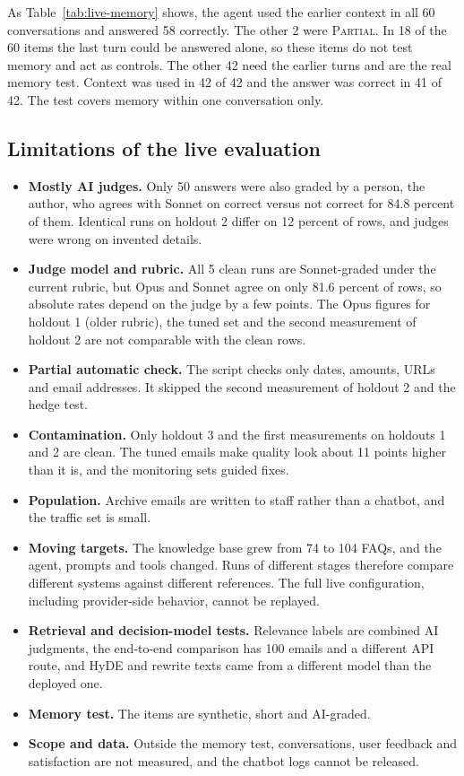 As Table~\ref{tab:live-memory} shows, the agent used the earlier context in all 60 conversations and answered 58 correctly. The other 2 were \textsc{Partial}. In 18 of the 60 items the last turn could be answered alone, so these items do not test memory and act as controls. The other 42 need the earlier turns and are the real memory test. Context was used in 42 of 42 and the answer was correct in 41 of 42. The test covers memory within one conversation only.

\subsection{Limitations of the live evaluation}
\label{sec:live-limits}

\begin{itemize}
  \item \textbf{Mostly AI judges.} Only 50 answers were also graded by a person, the author, who agrees with Sonnet on correct versus not correct for 84.8 percent of them. Identical runs on holdout 2 differ on 12 percent of rows, and judges were wrong on invented details.
  \item \textbf{Judge model and rubric.} All 5 clean runs are Sonnet-graded under the current rubric, but Opus and Sonnet agree on only 81.6 percent of rows, so absolute rates depend on the judge by a few points. The Opus figures for holdout 1 (older rubric), the tuned set and the second measurement of holdout 2 are not comparable with the clean rows.
  \item \textbf{Partial automatic check.} The script checks only dates, amounts, URLs and email addresses. It skipped the second measurement of holdout 2 and the hedge test.
  \item \textbf{Contamination.} Only holdout 3 and the first measurements on holdouts 1 and 2 are clean. The tuned emails make quality look about 11 points higher than it is, and the monitoring sets guided fixes.
  \item \textbf{Population.} Archive emails are written to staff rather than a chatbot, and the traffic set is small.
  \item \textbf{Moving targets.} The knowledge base grew from 74 to 104 FAQs, and the agent, prompts and tools changed. Runs of different stages therefore compare different systems against different references. The full live configuration, including provider-side behavior, cannot be replayed.
  \item \textbf{Retrieval and decision-model tests.} Relevance labels are combined AI judgments, the end-to-end comparison has 100 emails and a different API route, and HyDE and rewrite texts came from a different model than the deployed one.
  \item \textbf{Memory test.} The items are synthetic, short and AI-graded.
  \item \textbf{Scope and data.} Outside the memory test, conversations, user feedback and satisfaction are not measured, and the chatbot logs cannot be released.
\end{itemize}

